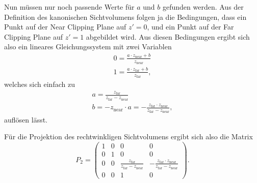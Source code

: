 Nun müssen nur noch passende Werte für $a$ und $b$ gefunden werden. Aus der Definition des kanonischen Sichtvolumens folgen ja die Bedingungen, dass ein Punkt auf der Near Clipping Plane auf $z'=0$, und ein Punkt auf der Far Clipping Plane auf $z'=1$ abgebildet wird. Aus diesen Bedingungen ergibt sich also ein lineares Gleichungssystem mit zwei Variablen
\begin{equation}
\begin{split}
 0 = \frac{a \cdot z_\mathrm{near} + b}{z_\mathrm{near}} \\
 1 = \frac{a \cdot z_\mathrm{far} + b}{z_\mathrm{far}},
\end{split}
\end{equation}
welches sich einfach zu
\begin{equation}
\begin{split}
 a = \frac{z_\mathrm{far}}{z_\mathrm{far}-z_\mathrm{near}} \\
 b = -z_\mathrm{near} \cdot a = -\frac{z_\mathrm{far} \cdot z_\mathrm{near}}{z_\mathrm{far}-z_\mathrm{near}},
\end{split} 
\end{equation}
auflösen lässt. 

Für die Projektion des rechtwinkligen Sichtvolumens ergibt sich also die Matrix
\begin{equation}
 P_2 = \begin{pmatrix}
  1 & 0 & 0 & 0 \\
  0 & 1 & 0 & 0 \\
  0 & 0 & \frac{z_\mathrm{far}}{z_\mathrm{far}-z_\mathrm{near}} & -\frac{z_\mathrm{far} \cdot z_\mathrm{near}}{z_\mathrm{far}-z_\mathrm{near}} \\
  0 & 0 & 1 & 0
 \end{pmatrix}.
\end{equation}

